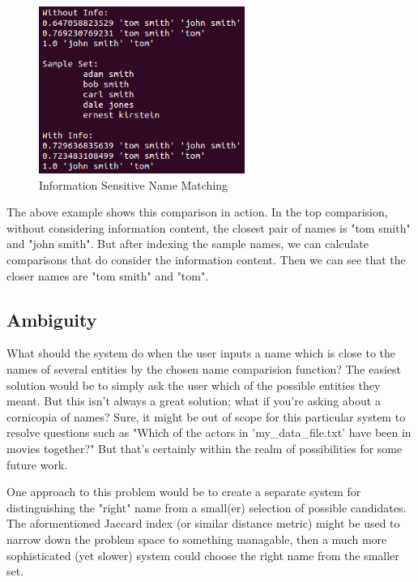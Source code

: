 \documentclass[11pt]{article}
\begin{document}
\begin{figure}[h!]
    \centering
    \includegraphics[width=0.6\textwidth,natwidth=1,natheight=1]{imgs/info_comp.png}
    \caption{Information Sensitive Name Matching}
    \label{fig:lev_comp}
\end{figure}

The above example shows this comparison in action. In the top comparision,
without considering information content, the closest pair of names is
"tom smith" and "john smith". But after indexing the sample names, we
can calculate comparisons that do consider the information content. Then
we can see that the closer names are "tom smith" and "tom".

\subsection{Ambiguity}
What should the system do when the user inputs a name which is close
to the names of several entities by the chosen name comparision
function? The easiest solution would be to simply ask the user which
of the possible entities they meant. But this isn't always a great
solution; what if you're asking about a cornicopia of names?
Sure, it might be out of scope for this particular system to
resolve questions such as "Which of the actors in 'my\_data\_file.txt'
have been in movies together?" But that's certainly within the
realm of possibilities for some future work.

One approach to this problem would be to create a separate
system for distinguishing the "right" name from a small(er) selection
of possible candidates. The aformentioned Jaccard index (or similar
distance metric) might be used to narrow down the problem space
to something managable, then a much more sophisticated (yet slower)
system could choose the right name from the smaller set.
\end{document}
